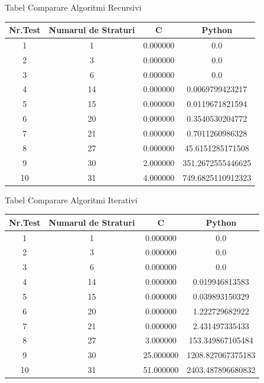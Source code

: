 \documentclass{article}
\begin{document}
\begin{center}

Tabel Comparare Algoritmi Recursivi

\begin{tabular}{|c|c|c|c|}
    \hline
    Nr.Test & Numarul de Straturi & C & Python \\[0.5ex]
    \hline \hline
    1 & 1 & 0.000000 & 0.0 \\
    \hline
    2 & 3 & 0.000000 & 0.0 \\
    \hline
    3 & 6 & 0.000000 & 0.0 \\
    \hline
    4 & 14 & 0.000000 &    0.0069799423217 \\
    \hline
    5 & 15 & 0.000000 &    0.0119671821594  \\
    \hline
    6 & 20 & 0.000000 &    0.3540530204772 \\
    \hline
    7 & 21 & 0.000000 &    0.7011260986328 \\
    \hline
    8 & 27 & 0.000000 &   45.6151285171508 \\
    \hline
    9 & 30 & 2.000000 &  351.2672555446625 \\
    \hline
    10 & 31 & 4.000000 & 749.6825110912323 \\[0.05ex]
    \hline
\end{tabular}

\vspace{\baselineskip}

Tabel Comparare Algoritmi Iterativi

\begin{tabular}{|c|c|c|c|}
    \hline
    Nr.Test & Numarul de Straturi & C & Python \\[0.5ex]
    \hline \hline
    1 & 1 & 0.000000 & 0.0 \\
    \hline
    2 & 3 & 0.000000 & 0.0 \\
    \hline
    3 & 6 & 0.000000 & 0.0 \\
    \hline
    4 & 14 & 0.000000 &      0.019946813583 \\
    \hline
    5 & 15 & 0.000000 &      0.039893150329 \\
    \hline
    6 & 20 & 0.000000 &      1.222729682922 \\
    \hline
    7 & 21 & 0.000000 &      2.431497335433 \\
    \hline
    8 & 27 & 3.000000 &    153.349867105484 \\
    \hline
    9 & 30 & 25.000000 &  1208.827067375183 \\
    \hline
    10 & 31 & 51.000000 & 2403.487896680832 \\[0.05ex]
    \hline
\end{tabular}
\end{center}
\end{document}
